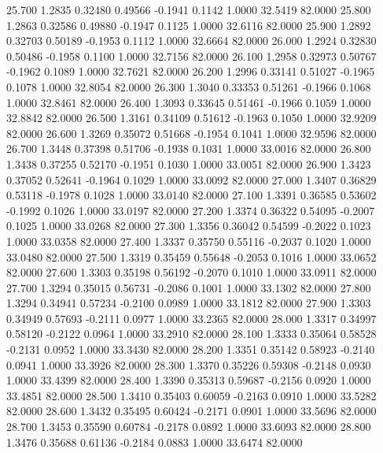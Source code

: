   25.700   1.2835   0.32480   0.49566  -0.1941   0.1142   1.0000  32.5419  82.0000
  25.800   1.2863   0.32586   0.49880  -0.1947   0.1125   1.0000  32.6116  82.0000
  25.900   1.2892   0.32703   0.50189  -0.1953   0.1112   1.0000  32.6664  82.0000
  26.000   1.2924   0.32830   0.50486  -0.1958   0.1100   1.0000  32.7156  82.0000
  26.100   1.2958   0.32973   0.50767  -0.1962   0.1089   1.0000  32.7621  82.0000
  26.200   1.2996   0.33141   0.51027  -0.1965   0.1078   1.0000  32.8054  82.0000
  26.300   1.3040   0.33353   0.51261  -0.1966   0.1068   1.0000  32.8461  82.0000
  26.400   1.3093   0.33645   0.51461  -0.1966   0.1059   1.0000  32.8842  82.0000
  26.500   1.3161   0.34109   0.51612  -0.1963   0.1050   1.0000  32.9209  82.0000
  26.600   1.3269   0.35072   0.51668  -0.1954   0.1041   1.0000  32.9596  82.0000
  26.700   1.3448   0.37398   0.51706  -0.1938   0.1031   1.0000  33.0016  82.0000
  26.800   1.3438   0.37255   0.52170  -0.1951   0.1030   1.0000  33.0051  82.0000
  26.900   1.3423   0.37052   0.52641  -0.1964   0.1029   1.0000  33.0092  82.0000
  27.000   1.3407   0.36829   0.53118  -0.1978   0.1028   1.0000  33.0140  82.0000
  27.100   1.3391   0.36585   0.53602  -0.1992   0.1026   1.0000  33.0197  82.0000
  27.200   1.3374   0.36322   0.54095  -0.2007   0.1025   1.0000  33.0268  82.0000
  27.300   1.3356   0.36042   0.54599  -0.2022   0.1023   1.0000  33.0358  82.0000
  27.400   1.3337   0.35750   0.55116  -0.2037   0.1020   1.0000  33.0480  82.0000
  27.500   1.3319   0.35459   0.55648  -0.2053   0.1016   1.0000  33.0652  82.0000
  27.600   1.3303   0.35198   0.56192  -0.2070   0.1010   1.0000  33.0911  82.0000
  27.700   1.3294   0.35015   0.56731  -0.2086   0.1001   1.0000  33.1302  82.0000
  27.800   1.3294   0.34941   0.57234  -0.2100   0.0989   1.0000  33.1812  82.0000
  27.900   1.3303   0.34949   0.57693  -0.2111   0.0977   1.0000  33.2365  82.0000
  28.000   1.3317   0.34997   0.58120  -0.2122   0.0964   1.0000  33.2910  82.0000
  28.100   1.3333   0.35064   0.58528  -0.2131   0.0952   1.0000  33.3430  82.0000
  28.200   1.3351   0.35142   0.58923  -0.2140   0.0941   1.0000  33.3926  82.0000
  28.300   1.3370   0.35226   0.59308  -0.2148   0.0930   1.0000  33.4399  82.0000
  28.400   1.3390   0.35313   0.59687  -0.2156   0.0920   1.0000  33.4851  82.0000
  28.500   1.3410   0.35403   0.60059  -0.2163   0.0910   1.0000  33.5282  82.0000
  28.600   1.3432   0.35495   0.60424  -0.2171   0.0901   1.0000  33.5696  82.0000
  28.700   1.3453   0.35590   0.60784  -0.2178   0.0892   1.0000  33.6093  82.0000
  28.800   1.3476   0.35688   0.61136  -0.2184   0.0883   1.0000  33.6474  82.0000
